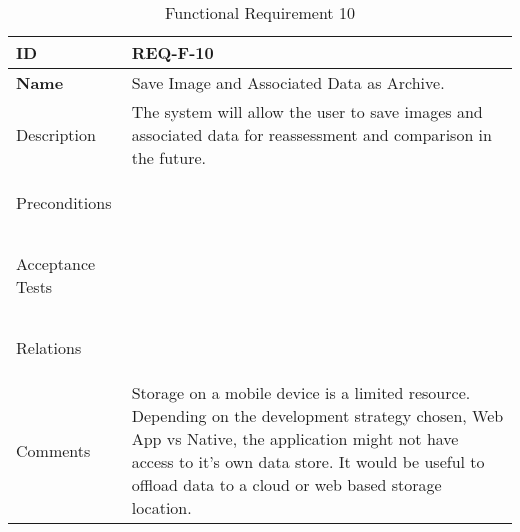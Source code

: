 \begin{table}[H]
    \begin{tabular}[t]{ | >{\bfseries}l | p{9.5cm} |}

    \hline
    ID
    &  REQ-F-10 \\ \hline

    Name
    & Save Image and Associated Data as Archive. \\ \hline

    Description
    & The system will allow the user to save images and associated data for reassessment and comparison in the future. \\ \hline

    Preconditions
    &  \\ \hline

    Acceptance Tests
    & \\ \hline

    Relations
    &  \\ \hline

    Comments &

        Storage on a mobile device is a limited resource. Depending on the development strategy chosen, Web App vs Native, the application might not have access to it's own data store. It would be useful to offload data to a cloud or web based storage location.

    \\ \hline

    \end{tabular}

    \caption{Functional Requirement 10}
    \label{fig:req_f_10}

\end{table}